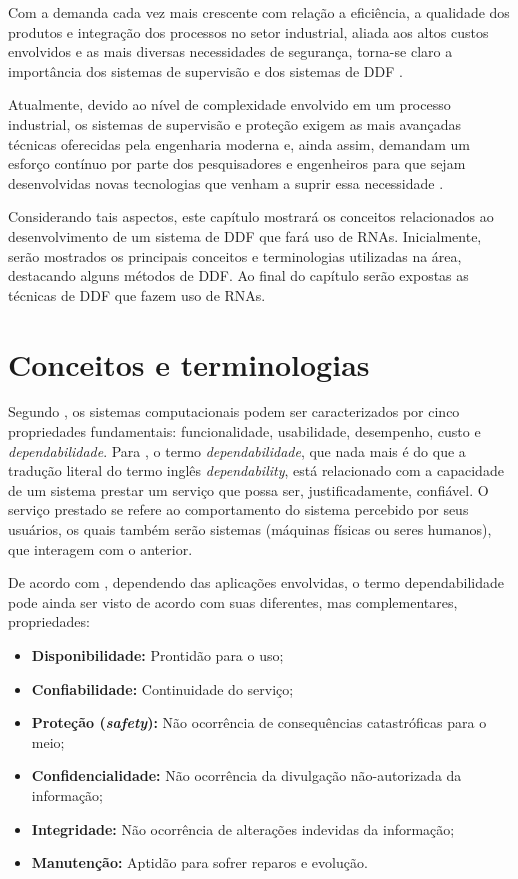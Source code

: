 \label{cap:detec_diag}

Com a demanda cada vez mais crescente com relação a eficiência, a qualidade dos
produtos e integração dos processos no setor industrial, aliada aos altos custos
envolvidos e as mais diversas necessidades de segurança, torna-se claro a
importância dos sistemas de supervisão e dos sistemas de DDF
\cite{isermann:2006}.

Atualmente, devido ao nível de complexidade envolvido em um processo industrial,
os sistemas de supervisão e proteção exigem as mais avançadas técnicas
oferecidas pela engenharia moderna e, ainda assim, demandam um esforço contínuo
por parte dos pesquisadores e engenheiros para que sejam desenvolvidas novas
tecnologias que venham a suprir essa necessidade \cite{silva:2008}.

Considerando tais aspectos, este capítulo mostrará os conceitos relacionados ao
desenvolvimento de um sistema de DDF que fará uso de RNAs. Inicialmente, serão
mostrados os principais conceitos e terminologias utilizadas na área, destacando
alguns métodos de DDF. Ao final do capítulo serão expostas as técnicas de DDF
que fazem uso de RNAs.

\section{Conceitos e terminologias}\label{sec:propriedades}
Segundo , os sistemas computacionais podem ser
caracterizados por cinco propriedades fundamentais: funcionalidade, usabilidade,
desempenho, custo e {\it dependabilidade}. Para , o
termo {\it dependabilidade}, que nada mais é do que a tradução literal do termo
inglês {\it dependability}, está relacionado com a capacidade de um sistema
prestar um serviço que possa ser, justificadamente, confiável. O serviço
prestado se refere ao comportamento do sistema percebido por seus usuários, os
quais também serão sistemas (máquinas físicas ou seres humanos), que interagem
com o anterior.

De acordo com , dependendo das aplicações envolvidas, o
termo dependabilidade pode ainda ser visto de acordo com suas diferentes, mas
complementares, propriedades:

\begin{itemize}
    \item {\bf Disponibilidade:} Prontidão para o uso;
    \item {\bf Confiabilidade:} Continuidade do serviço;
    \item \textbf{Proteção (\textit{safety}):} Não ocorrência de consequências
          catastróficas para o meio;
    \item {\bf Confidencialidade:} Não ocorrência da divulgação não-autorizada
          da informação;
    \item {\bf Integridade:} Não ocorrência de alterações indevidas da
          informação;
    \item {\bf Manutenção:} Aptidão para sofrer reparos e evolução.
\end{itemize}

